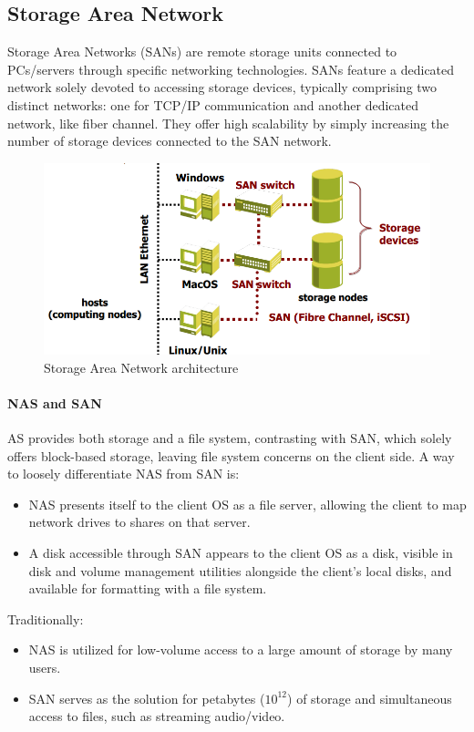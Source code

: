 \subsection{Storage Area Network}
Storage Area Networks (SANs) are remote storage units connected to PCs/servers through specific networking technologies. 
SANs feature a dedicated network solely devoted to accessing storage devices, typically comprising two distinct networks: one for TCP/IP communication and another dedicated network, like fiber channel. 
They offer high scalability by simply increasing the number of storage devices connected to the SAN network.
\begin{figure}[H]
    \centering
    \includegraphics[width=0.4\linewidth]{images/san.png}
    \caption{Storage Area Network architecture}
\end{figure}

\paragraph*{NAS and SAN}
AS provides both storage and a file system, contrasting with SAN, which solely offers block-based storage, leaving file system concerns on the client side. 
A way to loosely differentiate NAS from SAN is:
\begin{itemize}
    \item NAS presents itself to the client OS as a file server, allowing the client to map network drives to shares on that server.
    \item A disk accessible through SAN appears to the client OS as a disk, visible in disk and volume management utilities alongside the client's local disks, and available for formatting with a file system.
\end{itemize}
Traditionally:
\begin{itemize}
    \item NAS is utilized for low-volume access to a large amount of storage by many users.
    \item SAN serves as the solution for petabytes ($10^{12}$) of storage and simultaneous access to files, such as streaming audio/video.
\end{itemize}

